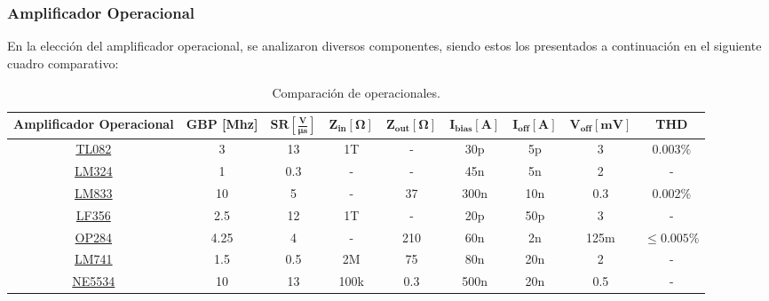 \subsubsection{Amplificador Operacional}
En la elección del amplificador operacional, se analizaron diversos componentes, siendo estos los presentados a continuación en el siguiente cuadro comparativo:
\begin{table}[H]
\hspace*{-0.5cm}
\begin{tabular}{ccccccccc}
\hline
\textbf{Amplificador Operacional} & \textbf{GBP [Mhz]} & $\mathbf{SR [\frac{V}{\mu s}]}$ & $\mathbf{Z_{in} [\Omega]}$ & $\mathbf{Z_{out}[\Omega]}$ & $\mathbf{I_{bias}[A]}$ & $\mathbf{I_{off}[A]}$ & $\mathbf{V_{off}[mV]}$ & \textbf{THD} \\ \hline
\href{http://www.ti.com/lit/ds/symlink/tl082-n.pdf}{TL082}                   & 3                  & 13                              & 1T                         & -                          & 30p                 & 5p                    & 3                      & 0.003$\%$    \\
\href{http://www.ti.com/lit/ds/symlink/lm324-n.pdf}{LM324}                    & 1                  & 0.3                             & -                          & -                          & 45n                  & 5n                     & 2                      & -            \\
\href{http://www.ti.com/lit/ds/symlink/lm833.pdf}{LM833}                    & 10                 & 5                               & -                          & 37                         & 300n                & 10n                   & 0.3                    & 0.002$\%$    \\
\href{http://www.ti.com/lit/ds/symlink/lf356-mil.pdf}{LF356}                    & 2.5                & 12                              & 1T                         & -                          & 20p                 & 50p                   & 3                      & -            \\
\href{https://www.alldatasheet.com/datasheet-pdf/pdf/49039/AD/OP284.html}{OP284}                    & 4.25                & 4                              & -                         & 210 & 60n                 & 2n                   & 125m                      & $\leq 0.005\%$           \\
\href{http://www.ti.com/lit/ds/symlink/lm741.pdf}{LM741}                    & 1.5                & 0.5                             & 2M                         & 75                         & 80n                 & 20n                   & 2                      & -            \\
\href{http://www.ti.com/lit/ds/slos070d/slos070d.pdf}{NE5534}                   & 10                 & 13                              & 100k                       & 0.3                        & 500n                & 20n                   & 0.5                    & -           \\
\hline
\end{tabular}
\caption{Comparación de operacionales.}
\end{table}

